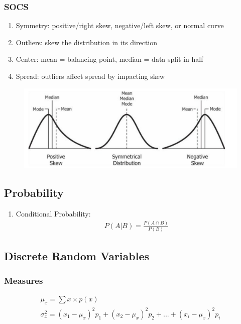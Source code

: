 \documentclass[12pt]{article}
\numberwithin{equation}{section}
\begin{document}
\subsubsection{SOCS}
\begin{enumerate}
    \item Symmetry: positive/right skew, negative/left skew, or normal curve
    \item Outliers: skew the distribution in its direction
    \item Center: mean = balancing point, median = data split in half
    \item Spread: outliers affect spread by impacting skew
\end{enumerate}
\begin{figure}[!ht]
    \centering
    \includegraphics[width=0.9\linewidth]{figures/skew.png}
\end{figure}

\subsection{Probability}
\begin{enumerate}
    \item Conditional Probability:
    \begin{align}
        P(A|B) = \frac{P(A \cap B)}{P(B)}
    \end{align}
\end{enumerate}

\subsection{Discrete Random Variables}
\subsubsection{Measures}
\begin{gather}
    \mu_x = \sum x \times p(x) \\
    \sigma^2_x = (x_1-\mu_x)^2 p_1 + (x_2-\mu_x)^2 p_2 + ... + (x_i-\mu_x)^2 p_i
\end{gather}
\end{document}
